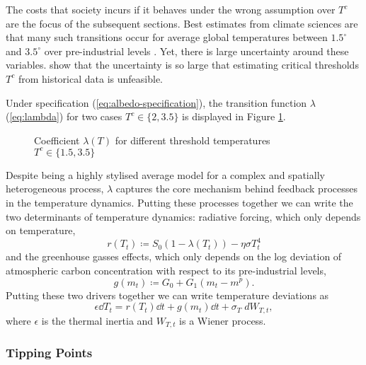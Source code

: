 \documentclass[../../main.tex]{subfiles}
\begin{document}
The costs that society incurs if it behaves under the wrong assumption over $T^c$ are the focus of the subsequent sections. Best estimates from climate sciences are that many such transitions occur for average global temperatures between $1.5^\circ$ and $3.5^\circ$ over pre-industrial levels \citep{seaver_wang_mechanisms_2023}. Yet, there is large uncertainty around these variables. \cite{ben-yami_uncertainties_2024} show that the uncertainty is so large that estimating critical thresholds $T^c$ from historical data is unfeasible.

Under specification (\ref{eq:albedo-specification}), the transition function $\lambda$ (\ref{eq:lambda}) for two cases $T^c \in \{2, 3.5\}$ is displayed in Figure \ref{fig:albedo_coefficient}. \begin{figure}[H]
    \centering
    
    \caption{Coefficient $\lambda(T)$ for different threshold temperatures $T^c \in \{1.5, 3.5\}$}
    \label{fig:albedo_coefficient}
\end{figure} Despite being a highly stylised average model for a complex and spatially heterogeneous process, $\lambda$ captures the core mechanism behind feedback processes in the temperature dynamics. Putting these processes together we can write the two determinants of temperature dynamics: radiative forcing, which only depends on temperature, \begin{equation} \label{eq:forcing}
    r(T_t) \coloneqq S_0 \left(1 - \lambda(T_t)\right) - \eta\sigma T_t^4
\end{equation} and the greenhouse gasses effects, which only depends on the log deviation of atmospheric carbon concentration with respect to its pre-industrial levels, \begin{equation}
    g(m_t) \coloneqq G_0 + G_1 (m_t - m^p).
\end{equation} Putting these two drivers together we can write temperature deviations as \begin{equation} \label{eq:dynamics:temperature}
    \epsilon \dd{T_t} = r(T_t) \dd{t} + g(m_t) \dd{t} + \sigma_T \; dW_{T, t}, 
\end{equation} where $\epsilon$ is the thermal inertia and $W_{T, t}$ is a Wiener process.

\subsubsection{Tipping Points}
\end{document}
